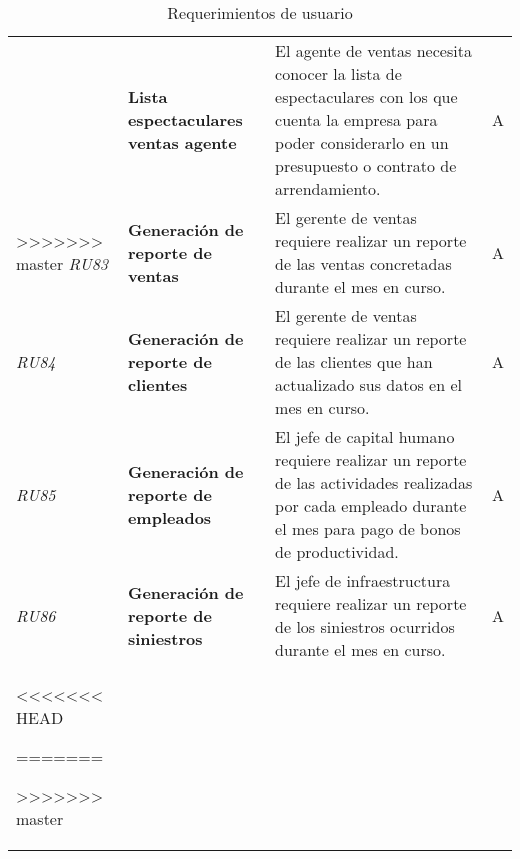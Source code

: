 \begin{longtable}[H]{m{2cm}m{3cm}m{5cm}m{2cm}}
\begin{longtable}[H]{m{1cm}m{3cm}m{10cm}m{1cm}}
\textit{RU82} & \textbf{Lista espectaculares ventas agente} & El agente de ventas necesita conocer la lista de espectaculares con los que cuenta la empresa para poder considerarlo en un presupuesto o contrato de arrendamiento. & A\tabularnewline
>>>>>>> master
\textit{RU83} & \textbf{Generación de reporte de ventas} & El gerente de ventas requiere realizar un reporte de las ventas concretadas durante el mes en curso. & A\tabularnewline
\textit{RU84} & \textbf{Generación de reporte de clientes} & El gerente de ventas requiere realizar un reporte de las clientes que han actualizado sus datos en el mes en curso. & A\tabularnewline
\textit{RU85} & \textbf{Generación de reporte de empleados} & El jefe de capital humano requiere realizar un reporte de las actividades realizadas por cada empleado durante el mes para pago de bonos de productividad. & A\tabularnewline
\textit{RU86} & \textbf{Generación de reporte de siniestros} & El jefe de infraestructura requiere realizar un reporte de los siniestros ocurridos durante el mes en curso. & A\tabularnewline
<<<<<<< HEAD
\caption{Requerimientos de usuario}
\label{tbl:listaRU}
\bottomrule
=======
\bottomrule
\caption{Requerimientos de usuario}
\label{tbl:listaRU}

>>>>>>> master
\end{longtable}
